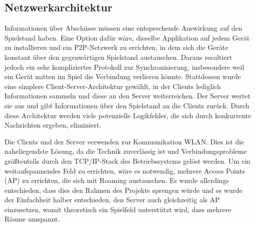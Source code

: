 \subsection{Netzwerkarchitektur}
\label{sec:architektur-netzwerkarchitektur}

Informationen über Abschüsse müssen eine entsprechende Auswirkung auf den Spielstand haben.
Eine Option dafür wäre, dieselbe Applikation auf jedem Gerät zu installieren und ein P2P-Netzwerk zu
errichten, in dem sich die Geräte konstant über den gegenwärtigen Spielstand austauschen.
Daraus resultiert jedoch ein sehr kompliziertes Protokoll zur Synchronisierung, insbesondere weil
ein Gerät mitten im Spiel die Verbindung verlieren könnte.
Stattdessen wurde eine simplere Client-Server-Architektur gewählt, in der Clients lediglich
Informationen sammeln und diese an den Server weiterreichen.
Der Server wertet sie aus und gibt Informationen über den Spielstand an die Clients zurück.
Durch diese Architektur werden viele potenzielle Logikfehler, die sich durch konkurrente Nachrichten
ergeben, eliminiert.

Die Clients und der Server verwenden zur Kommunikation WLAN. Dies ist die naheliegendste Lösung, da
die Technik zuverlässig ist und Verbindungsprobleme größtenteils durch den TCP/IP-Stack des
Betriebssystems gelöst werden.
Um ein weitaufspannendes Feld zu errichten, wäre es notwendig, mehrere Access Points (AP) zu
errichten, die sich mit Roaming austauschen.
Es wurde allerdings entschieden, dass dies den Rahmen des Projekts sprengen würde und es wurde der
Einfachheit halber entschieden, den Server auch gleichzeitig als AP einzusetzen, womit theoretisch
ein Spielfeld unterstützt wird, dass mehrere Räume umspannt.
